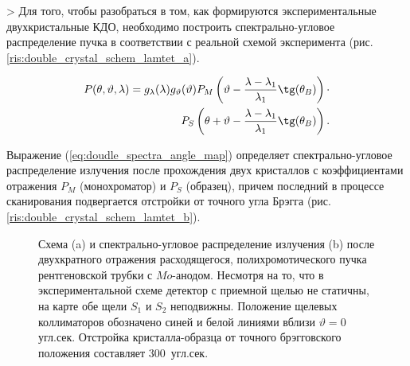 >
Для того, чтобы разобраться в том, как формируются экспериментальные
двухкристальные КДО, необходимо построить спектрально-угловое распределение пучка
в соответствии с реальной схемой эксперимента (рис. \ref{ris:double_crystal_schem_lamtet_a}).

\begin{eqnarray} \label{eq:doudle_spectra_angle_map}
  P(\theta,\vartheta,\lambda) = g_{\lambda}(\lambda)g_{\vartheta}(\vartheta) P_M \left(\vartheta - \frac{\lambda - \lambda_1}{\lambda_1}\tg(\theta_B) \right) \cdot \nonumber \\
   P_S \left(\theta + \vartheta - \frac{\lambda - \lambda_1}{\lambda_1}\tg(\theta_B)\right).
 \end{eqnarray}

Выражение (\ref{eq:doudle_spectra_angle_map}) определяет спектрально-угловое распределение излучения после прохождения двух кристаллов с
коэффициентами отражения  $P_M$ (монохроматор) и $P_S$ (образец), причем последний в процессе сканирования подвергается отстройки от точного угла Брэгга
 (рис. \ref{ris:double_crystal_schem_lamtet_b}).

\begin{figure}[H]
  \centering
  \hfill

  \caption{Схема (a) и спектрально-угловое распределение излучения (b) после двухкратного
  отражения расходящегося, полихромотического пучка рентгеновской трубки с $Mo$-анодом.
  Несмотря на то, что в экспериментальной схеме детектор с приемной
   щелью не статичны, на карте обе щели $S_1$ и $S_2$ неподвижны.
  Положение щелевых коллиматоров обозначено синей и белой линиями
  вблизи $\vartheta = 0$ угл.сек. Отстройка кристалла-образца от
  точного брэгговского положения составляет 300~угл.сек. }
  \label{ris:double_crystal_schem_lamtet}
\end{figure}

